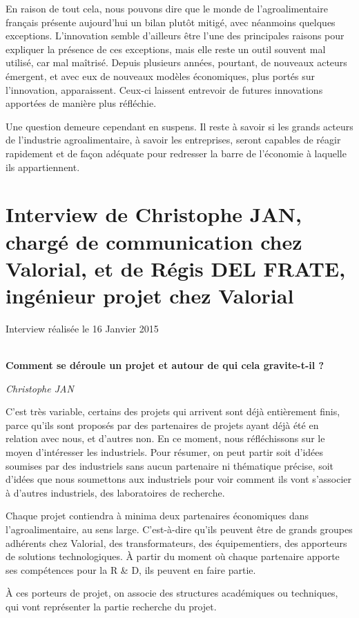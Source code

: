 \documentclass[a4paper,12pt]{report}
\begin{document}
    En raison de tout cela, nous pouvons dire que le monde de l'agroalimentaire français présente aujourd'hui un bilan plutôt mitigé, avec néanmoins quelques exceptions. L'innovation semble d'ailleurs être l'une des principales raisons pour expliquer la présence de ces exceptions, mais elle reste un outil souvent mal utilisé, car mal maîtrisé. Depuis plusieurs années, pourtant, de nouveaux acteurs émergent, et avec eux de nouveaux modèles économiques, plus portés sur l'innovation, apparaissent. Ceux-ci laissent entrevoir de futures innovations apportées de manière plus réfléchie.
    
    Une question demeure cependant en suspens. Il reste à savoir si les grands acteurs de l'industrie agroalimentaire, à savoir les entreprises, seront capables de réagir rapidement et de façon adéquate pour redresser la barre de l'économie à laquelle ils appartiennent.

\appendix
\chapter{Interview de Christophe JAN, chargé de communication chez Valorial, et de Régis DEL FRATE, ingénieur projet chez Valorial}
\label{Interview}

	Interview réalisée le 16 Janvier 2015

	\textbf{\\Comment se déroule un projet et autour de qui cela gravite-t-il ?}

	\emph{Christophe JAN}

	C’est très variable, certains des projets qui arrivent sont déjà entièrement finis, parce qu’ils sont proposés par des partenaires de projets ayant déjà été en relation avec nous, et d’autres non. En ce moment, nous réfléchissons sur le moyen d’intéresser les industriels.
Pour résumer, on peut partir soit d’idées soumises par des industriels sans aucun partenaire ni thématique précise, soit d’idées que nous soumettons aux industriels pour voir comment ils vont s’associer à d’autres industriels, des laboratoires de recherche.

	Chaque projet contiendra à minima deux partenaires économiques dans l'agroalimentaire, au sens large. C’est-à-dire qu’ils peuvent être de grands groupes adhérents chez Valorial, des transformateurs, des équipementiers, des apporteurs de solutions technologiques. À partir du moment où chaque partenaire apporte ses compétences pour la R \& D, ils peuvent en faire partie.


	À ces porteurs de projet, on associe des structures académiques ou techniques, qui vont représenter la partie recherche du projet.
\end{document}
